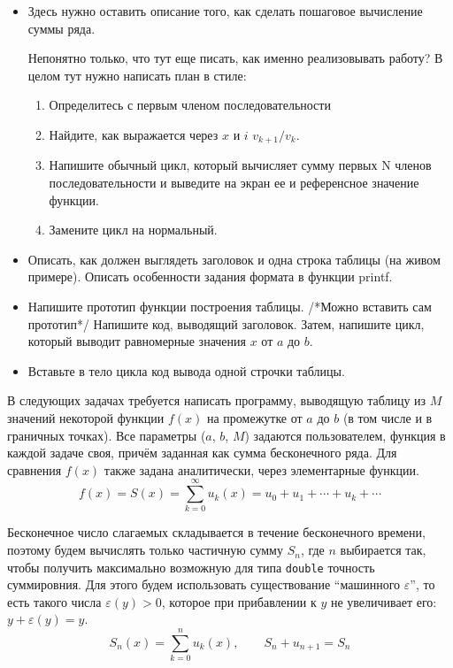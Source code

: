 \begin{itemize}
	\item Здесь нужно оставить описание того, как сделать пошаговое вычисление суммы ряда.
	
	Непонятно только, что тут еще писать, как именно реализовывать работу? В целом тут нужно написать план в стиле:
	\begin{enumerate}
		\item Определитесь с первым членом последовательности
		\item Найдите, как выражается через $x$ и $i$ $v_{k+1}/v_k$. 
		\item Напишите обычный цикл, который вычисляет сумму  первых N членов последовательности и выведите на экран ее и референсное значение функции.
		\item Замените цикл на нормальный.
		 
	\end{enumerate}
	\item Описать, как должен выглядеть заголовок и одна строка таблицы (на живом примере). Описать особенности задания формата в функции printf.
	\item Напишите прототип функции построения таблицы. /*Можно вставить сам прототип*/ Напишите код, выводящий заголовок.
	Затем, напишите цикл, который выводит равномерные значения $x$ от $a$ до $b$. 
	\item Вставьте в тело цикла код вывода одной строчки таблицы.
\end{itemize}
В следующих задачах требуется написать программу, выводящую таблицу из $M$
значений некоторой функции $f(x)$ на промежутке от $a$ до $b$ (в том числе и в
граничных точках). Все параметры ($a$, $b$, $M$) задаются пользователем,
функция в каждой задаче своя, причём заданная как сумма бесконечного ряда. Для
сравнения $f(x)$ также задана аналитически, через элементарные функции.
%
\[
  f(x)=S(x)=\sum_{k=0}^\infty u_k(x)=u_0+u_1+\cdots+u_k+\cdots
\]

Бесконечное число слагаемых складывается в течение бесконечного времени,
поэтому будем вычислять только частичную сумму $S_n$, где $n$ выбирается так,
чтобы получить максимально возможную для типа \texttt{double} точность
суммировния. Для этого будем использовать существование ``машинного
$\varepsilon$'', то есть такого числа $\varepsilon(y) > 0$, которое при
прибавлении к $y$ не увеличивает его: $y + \varepsilon(y) = y$.
%
\[
  S_n(x)=\sum_{k=0}^n u_k(x),\qquad S_n + u_{n+1} = S_n
\]


